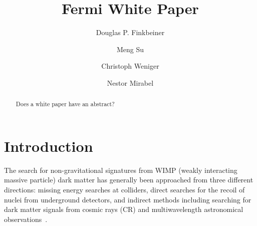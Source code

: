 \documentclass[aps,prd,superscriptaddress,showpacs]{revtex4}
\begin{document}
\title{Fermi White Paper}

\author{Douglas P. Finkbeiner}

\author{Meng Su}

\author{Christoph Weniger}

\author{Nestor Mirabel}

\begin{abstract} Does a white paper have an abstract?
\end{abstract}


\maketitle



\section{Introduction}


The search for non-gravitational signatures from WIMP
(weakly interacting massive particle) dark matter has 
generally been approached from three different directions: missing
energy searches at colliders, direct searches for the
recoil of nuclei from underground detectors, and indirect
methods including searching for dark matter signals from cosmic
rays (CR) and multiwavelength astronomical
observations~\citep{Jungman:1995df, Bergstrom:2000, Bertone:2005, Hooper:2007Review,
2012arXiv1205.4882B, Cirelli:2012tf}.
\end{document}
